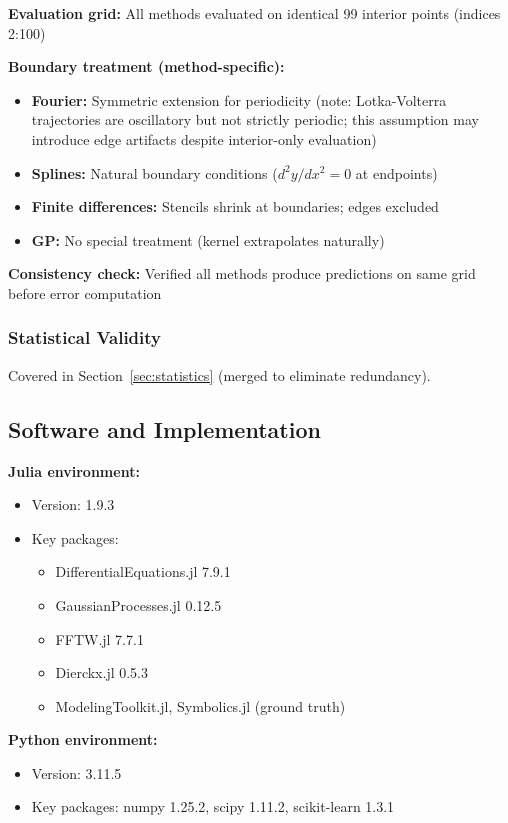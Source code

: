 \textbf{Evaluation grid:} All methods evaluated on identical 99 interior points (indices 2:100)

\textbf{Boundary treatment (method-specific):}
\begin{itemize}
    \item \textbf{Fourier:} Symmetric extension for periodicity (note: Lotka-Volterra trajectories are oscillatory but not strictly periodic; this assumption may introduce edge artifacts despite interior-only evaluation)
    \item \textbf{Splines:} Natural boundary conditions ($d^2y/dx^2=0$ at endpoints)
    \item \textbf{Finite differences:} Stencils shrink at boundaries; edges excluded
    \item \textbf{GP:} No special treatment (kernel extrapolates naturally)
\end{itemize}

\textbf{Consistency check:} Verified all methods produce predictions on same grid before error computation

\subsubsection{Statistical Validity}

Covered in Section~\ref{sec:statistics} (merged to eliminate redundancy).

\subsection{Software and Implementation}
\label{sec:software}

\textbf{Julia environment:}
\begin{itemize}
    \item Version: 1.9.3
    \item Key packages:
    \begin{itemize}
        \item DifferentialEquations.jl 7.9.1
        \item GaussianProcesses.jl 0.12.5
        \item FFTW.jl 7.7.1
        \item Dierckx.jl 0.5.3
        \item ModelingToolkit.jl, Symbolics.jl (ground truth)
    \end{itemize}
\end{itemize}

\textbf{Python environment:}
\begin{itemize}
    \item Version: 3.11.5
    \item Key packages: numpy 1.25.2, scipy 1.11.2, scikit-learn 1.3.1
\end{itemize}

